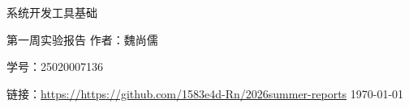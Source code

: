 \documentclass[12pt, a4paper]{article}
\newcommand{\myname}{魏尚儒}
\newcommand{\myid}{25020007136}
\newcommand{\mygithub}{https://https://github.com/1583e4d-Rn/2026summer-reports}
\begin{document}
\begin{titlepage}
    \centering
    \thispagestyle{empty}
    {\Huge 系统开发工具基础}
    \par
    \vspace{1em}
    {\Large 第一周实验报告}
    \vfill
    {\large 作者：\myname}
    \par
    {\large 学号：\myid}
    \par
    {\large 链接：\url{\mygithub}}
    {\large \today}

\end{titlepage}


\tableofcontents
\thispagestyle{empty}
\newpage




\end{document}
